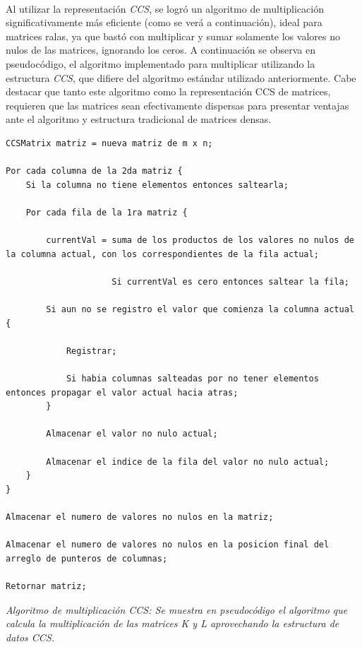 \documentclass[a4paper,11pt]{article}
\begin{document}
\paragraph{}
Al utilizar la representaci\'on \emph{CCS}, se logr\'o un algoritmo de
multiplicaci\'on significativamente m\'as eficiente (como se verá a
continuación), ideal para matrices ralas, ya que bastó con multiplicar y sumar
solamente los valores no nulos de las matrices, ignorando los ceros.
A continuaci\'on se observa en pseudoc\'odigo, el algoritmo implementado para
multiplicar utilizando la estructura \emph{CCS}, que difiere del algoritmo
est\'andar utilizado anteriormente. Cabe destacar que tanto este algoritmo como
la representación CCS de matrices, requieren que las matrices sean efectivamente
dispersas para presentar ventajas ante el algoritmo y estructura tradicional
de matrices densas.\\
\newpage
\small\begin{lstlisting}
CCSMatrix matriz = nueva matriz de m x n;

Por cada columna de la 2da matriz {
    Si la columna no tiene elementos entonces saltearla;

 	Por cada fila de la 1ra matriz {

 		currentVal = suma de los productos de los valores no nulos de la columna actual, con los correspondientes de la fila actual;

		             Si currentVal es cero entonces saltear la fila;

 		Si aun no se registro el valor que comienza la columna actual {

	 		Registrar;

 			Si habia columnas salteadas por no tener elementos entonces propagar el valor actual hacia atras;
		}

 		Almacenar el valor no nulo actual;

 		Almacenar el indice de la fila del valor no nulo actual;
	}
}

Almacenar el numero de valores no nulos en la matriz;

Almacenar el numero de valores no nulos en la posicion final del arreglo de punteros de columnas;

Retornar matriz;

\end{lstlisting}
\small\emph{Algoritmo de multiplicaci\'on CCS: Se muestra en pseudoc\'odigo el
algoritmo que calcula la multiplicaci\'on de las matrices K y L aprovechando la
estructura de datos CCS.}
\end{document}
